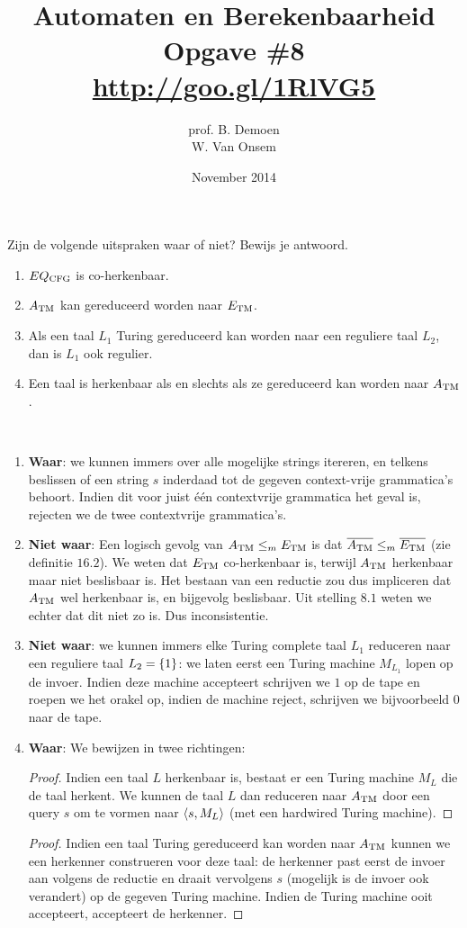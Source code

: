\documentclass[a4paper]{article}
\title{Automaten en Berekenbaarheid\\Opgave \#8\\\url{http://goo.gl/1RlVG5}}
\author{prof. B. Demoen\\W. Van Onsem}
\date{November 2014}
\begin{document}
\maketitle

\begin{question}
Zijn de volgende uitspraken waar of niet? Bewijs je antwoord.
\begin{enumerate}
  \item $EQ_{\rm CFG}$ is co-herkenbaar.
  \item $A_{\rm TM}$ kan gereduceerd worden naar $E_{\rm TM}$.
  \item Als een taal $L_1$ Turing gereduceerd kan worden naar een reguliere taal $L_2$, dan is $L_1$ ook regulier.
  \item Een taal is herkenbaar als en slechts als ze gereduceerd kan worden naar $A_{\rm TM}$.
\end{enumerate}
\begin{answer}~~
\begin{enumerate}
 \item \textbf{Waar}: we kunnen immers over alle mogelijke strings itereren, en telkens beslissen of een string $s$ inderdaad tot de gegeven context-vrije grammatica's behoort. Indien dit voor juist \'e\'en contextvrije grammatica het geval is, rejecten we de twee contextvrije grammatica's.
 \item \textbf{Niet waar}: Een logisch gevolg van $A_{\rm TM}\leq_mE_{\rm TM}$ is dat $\overline{A_{\rm TM}}\leq_m\overline{E_{\rm TM}}$ (zie definitie $16.2$). We weten dat $E_{\rm TM}$ co-herkenbaar is, terwijl $A_{\rm TM}$ herkenbaar maar niet beslisbaar is. Het bestaan van een reductie zou dus impliceren dat $A_{\rm TM}$ wel herkenbaar is, en bijgevolg beslisbaar. Uit stelling $8.1$ weten we echter dat dit niet zo is. Dus inconsistentie.
 \item \textbf{Niet waar}: we kunnen immers elke Turing complete taal $L_1$ reduceren naar een reguliere taal $L_2=\left\{ 1 \right\}$: we laten eerst een Turing machine $M_{L_1}$ lopen op de invoer. Indien deze machine accepteert schrijven we $1$ op de tape en roepen we het orakel op, indien de machine reject, schrijven we bijvoorbeeld $0$ naar de tape.
 \item \textbf{Waar}: We bewijzen in twee richtingen:
 \begin{proof}
 Indien een taal $L$ herkenbaar is, bestaat er een Turing machine $M_L$ die de taal herkent. We kunnen de taal $L$ dan reduceren naar $A_{\rm TM}$ door een query $s$ om te vormen naar $\left\langle s,M_L \right\rangle$ (met een hardwired Turing machine).
 \end{proof}
 \begin{proof}
  Indien een taal Turing gereduceerd kan worden naar $A_{\rm TM}$ kunnen we een herkenner construeren voor deze taal: de herkenner past eerst de invoer aan volgens de reductie en draait vervolgens $s$ (mogelijk is de invoer ook verandert) op de gegeven Turing machine. Indien de Turing machine ooit accepteert, accepteert de herkenner.
 \end{proof}
\end{enumerate}
\end{answer}
\end{question}
\end{document}
